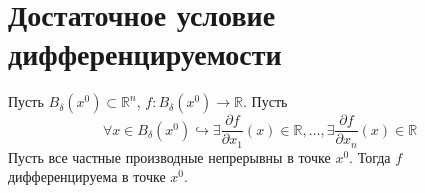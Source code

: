 \documentclass[11pt]{article}
\begin{document}
\section{Достаточное условие дифференцируемости}

\begin{theorem}
    Пусть $B_{\delta}\left(x^0\right) \subset \mathbb{R}^n$, $f \colon B_{\delta}\left(x^0\right) \to \mathbb{R}$. Пусть 
    \[\forall x \in B_{\delta} \left(x^0\right) \hookrightarrow \exists \frac{\partial f}{\partial x_1}(x) \in \mathbb{R}, \ldots, \exists \frac{\partial f}{\partial x_n}(x) \in \mathbb{R}\]
    Пусть все частные производные непрерывны в точке $x^0$. Тогда $f$ дифференцируема в точке $x^0$.
\end{theorem}                       
\end{document}
